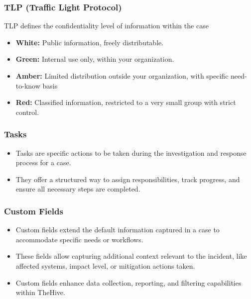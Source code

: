 \documentclass{book}
\begin{document}
\newpage

\subsubsection{TLP (Traffic Light Protocol)}
TLP defines the confidentiality level of information within the case
\begin{itemize}
    \item \textbf{White:} Public information, freely distributable.
    \item \textbf{Green:} Internal use only, within your organization.
    \item \textbf{Amber:} Limited distribution outside your organization, with specific need-to-know basis
    \item \textbf{Red:} Classified information, restricted to a very small group with strict control. 
\end{itemize}

\subsubsection{Tasks}
\begin{itemize}
    \item Tasks are specific actions to be taken during the investigation and response process for a case.
    \item They offer a structured way to assign responsibilities, track progress, and ensure all necessary steps are completed.
\end{itemize}

\subsubsection{Custom Fields}
\begin{itemize}
    \item Custom fields extend the default information captured in a case to accommodate specific needs or workflows.
    \item These fields allow capturing additional context relevant to the incident, like affected systems, impact level, or mitigation actions taken.
    \item Custom fields enhance data collection, reporting, and filtering capabilities within TheHive.
\end{itemize}

\bigskip
\bigskip


\newpage
\end{document}
